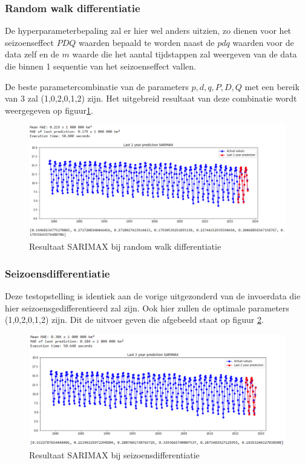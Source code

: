 \subsubsection{Random walk differentiatie} 

De hyperparameterbepaling zal er hier wel anders uitzien, zo dienen voor het seizoenseffect $PDQ$ waarden bepaald te worden naast de $pdq$ waarden voor de data zelf en de $m$ waarde die het aantal tijdstappen zal weergeven van de data die binnen 1 sequentie van het seizoenseffect vallen.

De beste parametercombinatie van de parameters $p, d, q, P, D, Q$ met een bereik van 3 zal (1,0,2,0,1,2) zijn. Het uitgebreid resultaat van deze combinatie wordt weergegeven op figuur\ref{fig:uvssarimaxdiff}.

\begin{figure}
    \centering
    \caption{Resultaat SARIMAX bij random walk differentiatie}
    \label{fig:uvssarimaxdiff}
    \includegraphics[width=1\linewidth]{uv_s_sarimax_diff}
\end{figure}


\subsubsection{Seizoensdifferentiatie}

Deze testopstelling is identiek aan de vorige uitgezonderd van de invoerdata die hier seizoensgedifferentieerd zal zijn. Ook hier zullen de optimale parameters (1,0,2,0,1,2) zijn. Dit de uitvoer geven die afgebeeld staat op figuur \ref{fig:uvssarimaxsdiff}.

\begin{figure}
    \centering
    \caption{Resultaat SARIMAX bij seizoensdifferentiatie}
    \label{fig:uvssarimaxsdiff}
    \includegraphics[width=1\linewidth]{uv_s_sarimax_s_diff}
\end{figure}


